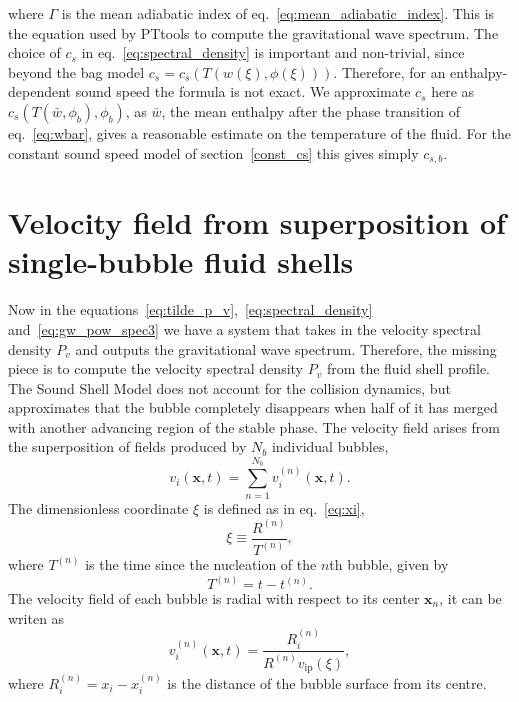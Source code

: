 where $\Gamma$ is the mean adiabatic index of eq.~\eqref{eq:mean_adiabatic_index}.
This is the equation used by PTtools to compute the gravitational wave spectrum.
The choice of $c_s$ in eq.~\eqref{eq:spectral_density} is important and non-trivial,
since beyond the bag model $c_s = c_s(T(w(\xi),\phi(\xi)))$.
Therefore, for an enthalpy-dependent sound speed the formula is not exact.
We approximate $c_s$ here as $c_s(T(\bar{w},\phi_b),\phi_b)$,
as $\bar{w}$, the mean enthalpy after the phase transition of eq.~\eqref{eq:wbar},
gives a reasonable estimate on the temperature of the fluid.
For the constant sound speed model of section~\ref{const_cs} this gives simply $c_{s,b}$.


\section{Velocity field from superposition of single-bubble fluid shells}
\label{velocity_field}
Now in the equations~\eqref{eq:tilde_p_v},~\eqref{eq:spectral_density} and~\eqref{eq:gw_pow_spec3}
we have a system that takes in the velocity spectral density $P_v$ and outputs the gravitational wave spectrum.
Therefore, the missing piece is to compute the velocity spectral density $P_v$ from the fluid shell profile.
The Sound Shell Model does not account for the collision dynamics,
but approximates that the bubble completely disappears when half of it has merged with another advancing region of the stable phase.
The velocity field arises from the superposition of fields produced by $N_b$ individual bubbles,
\cite[eq. 4.1]{hindmarsh_gw_pt_2019}
\begin{equation}
v_i(\mathbf{x},t) = \sum_{n=1}^{N_b} v_i^{(n)} (\mathbf{x},t).
\end{equation}
The dimensionless coordinate $\xi$ is defined as in eq.~\eqref{eq:xi},
\begin{equation}
\xi \equiv \frac{R^{(n)}}{T^{(n)}},
\end{equation}
where $T^{(n)}$ is the time since the nucleation of the $n$th bubble, given by
\begin{equation}
T^{(n)} = t - t^{(n)}.
\label{eq:bubble_lifetime}
\end{equation}
The velocity field of each bubble is radial with respect to its center $\mathbf{x}_n$, it can be writen as
\cite[eq. 4.2]{hindmarsh_gw_pt_2019}
\begin{equation}
v_i^{(n)}(\mathbf{x},t) = \frac{R_i^{(n)}}{R^{(n)} v_\text{ip}(\xi)},
\end{equation}
where $R_i^{(n)} = x_i - x_i^{(n)}$ is the distance of the bubble surface from its centre.
